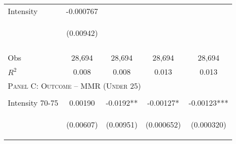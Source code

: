 \begin{subtables}
\begin{table}[htpb!]
\begin{center}
\begin{tabular}{p{5cm}cccc}
Intensity  	&	-0.000767	&		&		&		 \\
	& \begin{footnotesize}	(0.00942)	\end{footnotesize} & \begin{footnotesize}		\end{footnotesize} & \begin{footnotesize}		\end{footnotesize} & \begin{footnotesize}		\end{footnotesize} \\
\vspace{4pt}	&	\begin{footnotesize}\end{footnotesize}	&	\begin{footnotesize}\end{footnotesize}	&	\begin{footnotesize}\end{footnotesize}	&	\begin{footnotesize}\end{footnotesize}	 \\
Obs	&	28,694	&	28,694	&	28,694	&	28,694	\\  
$R^2$	&	0.008	&	0.008	&	0.013	&	0.013	\\ \midrule
\multicolumn{5}{l}{\textsc{Panel C: Outcome – MMR (Under 25)}}									\\  
\vspace{4pt}	&	\begin{footnotesize}\end{footnotesize}	&	\begin{footnotesize}\end{footnotesize}	&	\begin{footnotesize}\end{footnotesize}	&	\begin{footnotesize}\end{footnotesize}	 \\
Intensity 70-75	&	0.00190	&	-0.0192**	&	-0.00127*	&	-0.00123***	 \\
	& \begin{footnotesize}	(0.00607)	\end{footnotesize} & \begin{footnotesize}	(0.00951)	\end{footnotesize} & \begin{footnotesize}	(0.000652)	\end{footnotesize} & \begin{footnotesize}	(0.000320)	\end{footnotesize} \\

\end{tabular}
\end{center}
\end{table}
\end{subtables}
